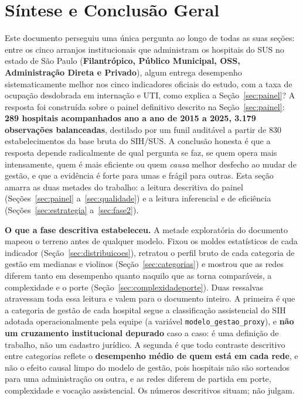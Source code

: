 \section{Síntese e Conclusão Geral}
\label{sec:conclusao}

Este documento perseguiu uma única pergunta ao longo de todas as suas
seções: entre os cinco arranjos institucionais que administram os
hospitais do SUS no estado de São Paulo (\textbf{Filantrópico, Público
Municipal, OSS, Administração Direta e Privado}), algum entrega
desempenho sistematicamente melhor nos cinco indicadores oficiais do
estudo, com a taxa de ocupação desdobrada em internação e UTI, como
explica a Seção~\ref{sec:painel}? A resposta foi construída sobre o painel definitivo descrito na
Seção~\ref{sec:painel}: \textbf{289 hospitais acompanhados ano a ano de
2015 a 2025, 3.179 observações balanceadas}, destilado por um funil
auditável a partir de 830 estabelecimentos da base bruta do SIH/SUS. A
conclusão honesta é que a resposta depende radicalmente de qual pergunta
se faz, se quem opera mais intensamente, quem é mais eficiente ou quem
\emph{causa} melhor desfecho ao mudar de gestão, e que a evidência é
forte para umas e frágil para outras. Esta seção amarra as duas metades
do trabalho: a leitura descritiva do painel (Seções~\ref{sec:painel}
a~\ref{sec:qualidade}) e a leitura inferencial e de eficiência
(Seções~\ref{sec:estrategia} a~\ref{sec:fase2}).

\textbf{O que a fase descritiva estabeleceu.} A metade exploratória do
documento mapeou o terreno antes de qualquer modelo. Fixou os moldes
estatísticos de cada indicador (Seção~\ref{sec:distribuicoes}),
retratou o perfil bruto de cada categoria de gestão em medianas e
violinos (Seção~\ref{sec:categorias}) e mostrou que as redes diferem
tanto em desempenho quanto naquilo que as torna comparáveis, a
complexidade e o porte (Seção~\ref{sec:complexidadeporte}). Duas
ressalvas atravessam toda essa leitura e valem para o documento
inteiro. A primeira é que a categoria de gestão de cada hospital segue
a classificação assistencial do SIH adotada operacionalmente pela
equipe (a variável \texttt{modelo\_gestao\_proxy}), e \textbf{não um
cruzamento institucional depurado} caso a caso: é uma definição de
trabalho, não um cadastro jurídico. A segunda é que todo contraste
descritivo entre categorias reflete o \textbf{desempenho médio de quem
está em cada rede}, e não o efeito causal limpo do modelo de gestão,
pois hospitais não são sorteados para uma administração ou outra, e as
redes diferem de partida em porte, complexidade e vocação assistencial.
Os números descritivos situam; não julgam.


